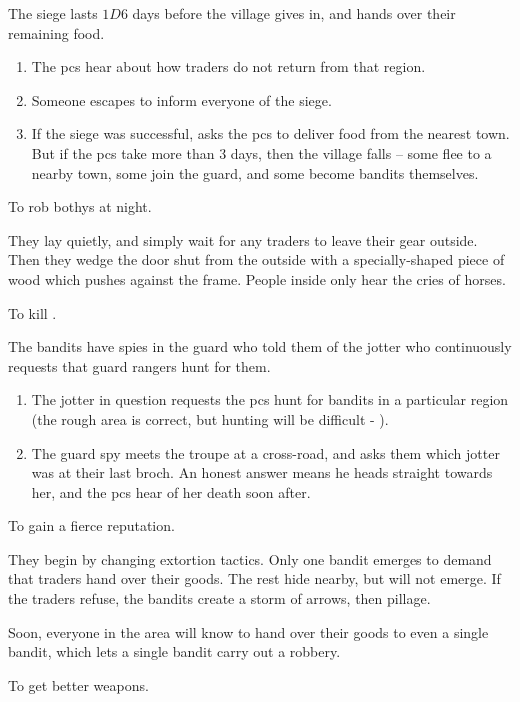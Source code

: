 \begin{multicols}{2}
\begin{dlistDouble}
  The siege lasts $1D6$ days before the \gls{village} gives in, and hands over their remaining food.
  \begin{enumerate}
    \item
    The \glspl{pc} hear about how traders do not return from that region.
    \item
    Someone escapes to inform everyone of the siege.
    \item
    If the siege was successful,  asks the \glspl{pc} to deliver food from the nearest town.
    But if the \glspl{pc} take more than 3 days, then the \gls{village} falls -- some flee to a nearby town, some join the \gls{guard}, and some become bandits themselves.
  \end{enumerate}
  \item
  To rob \glspl{bothy} at night.

  They lay quietly, and simply wait for any traders to leave their gear outside.
  Then they wedge the door shut from the outside with a specially-shaped piece of wood which pushes against the frame.
  People inside only hear the cries of horses.
  \item
  To kill .

  The bandits have spies in the \gls{guard} who told them of the \gls{jotter} who continuously requests that \gls{guard} rangers hunt for them.
  \begin{enumerate}
    \item
    The \gls{jotter} in question requests the \glspl{pc} hunt for bandits in a particular region (the rough area is correct, but hunting will be difficult - \tn[14]).
    \item
    The \gls{guard} spy meets the troupe at a cross-road, and asks them which \gls{jotter} was at their last \gls{broch}.
    An honest answer means he heads straight towards her, and the \glspl{pc} hear of her death soon after.
  \end{enumerate}
  \item
  To gain a fierce reputation.

  They begin by changing extortion tactics.
  Only one bandit emerges to demand that traders hand over their goods.
  The rest hide nearby, but will not emerge.
  If the traders refuse, the bandits create a storm of arrows, then pillage.

  Soon, everyone in the area will know to hand over their goods to even a single bandit, which lets a single bandit carry out a robbery.
  \item
  To get better weapons.


\end{dlistDouble}
\end{multicols}
